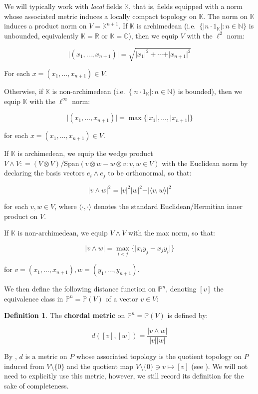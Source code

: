 \documentclass[12pt]{article}
\theoremstyle{definition}
\newtheorem{defn}[thm]{Definition}
\newcommand{\N}{\mathbb{N}}
\newcommand{\R}{\mathbb{R}}
\newcommand{\C}{\mathbb{C}}
\newcommand{\K}{\mathbb{K}}
\newcommand{\Span}{\mathrm{Span}}
\begin{document}
We will typically work with \emph{local} fields $\K$, that is, fields equipped with a norm whose associated metric induces a locally compact topology on $\K$. The norm on $\K$ induces a product norm on $V = \K^{n+1}$. If $\K$ is archimedean (i.e.\ $\{\vert n \cdot 1_{\K} \vert : n \in \N\}$ is unbounded, equivalently $\K = \R$ or $\K = \C$), then we equip $V$ with the $\ell^2$ norm: 

$$\vert (x_1,\ldots,x_{n+1}) \vert = \sqrt{\vert x_1\vert^2 + \cdots + \vert x_{n+1} \vert^2}$$

For each $x = (x_1,\ldots,x_{n+1}) \in V$. 

Otherwise, if $\K$ is non-archimedean (i.e.\ $\{\vert n \cdot 1_{\K} \vert: n \in \N\}$ is bounded), then we equip $\K$ with the $\ell^{\infty}$ norm: 

$$\vert (x_1,\ldots,x_{n+1}) \vert = \max \{\vert x_1 \vert, \ldots, \vert x_{n+1} \vert\}$$

for each $x = (x_1,\ldots,x_{n+1}) \in V$. 

If $\K$ is archimedean, we equip the wedge product $V \wedge V: = (V \otimes V)/\Span(v \otimes w - w \otimes v : v,w \in V)$ with the Euclidean norm by declaring the basis vectors $e_i \wedge e_j$ to be orthonormal, so that: 

$$\vert v \wedge w \vert^2 = \vert v \vert^2 \vert w \vert^2 - \vert \langle v,w \rangle \vert^2 $$

for each $v,w \in V$, where $\langle \cdot, \cdot \rangle$ denotes the standard Euclidean/Hermitian inner product on $V$. 

If $\K$ is non-archimedean, we equip $V \wedge V$ with the max norm, so that: 

$$\vert v \wedge w \vert = \max_{i<j} \{\vert x_i y_j - x_j y_i \vert \}$$

for $v = (x_1,\ldots,x_{n+1}), w=(y_1,\ldots,y_{n+ 1})$. 

We then define the following distance function on $\mathbb{P}^n$, denoting $[v]$ the equivalence class in $\mathbb{P}^n = \mathbb{P}(V)$ of a vector $v \in V$: 

\begin{defn}
    The \textbf{chordal metric} on $\mathbb{P}^n = \mathbb{P}(V)$ is defined by: 

    $$d([v], [w]) = \frac{\vert v \wedge w \vert}{\vert v \vert \vert w \vert}$$
\end{defn}

By \cite[Theorem 2.77]{KapDrutu}, $d$ is a metric on $P$ whose associated topology is the quotient topology on $P$ induced from $V \setminus \{0\}$ and the quotient map $V \setminus \{0\} \ni v \mapsto [v]$ (see \cite[Exercise 2.78]{KapDrutu}). We will not need to explicitly use this metric, however, we still record its definition for the sake of completeness. 
\end{document}
